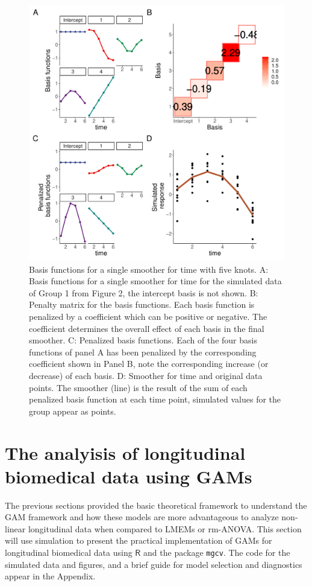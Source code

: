 \documentclass[
]{article}
\newcommand{\passthrough}[1]{#1}
\begin{document}
\begin{figure}[H]

{\centering \includegraphics[width=0.75\linewidth,]{Full_document_files/figure-latex/basis-plot-1} 

}

\caption{Basis functions for a single smoother for time with five knots. A: Basis functions for a single smoother for time for the simulated data of Group 1 from Figure 2, the intercept basis is not shown. B: Penalty matrix for the basis functions. Each basis function is penalized by a coefficient which can be positive or negative. The coefficient determines the overall effect of each basis in the final smoother. C: Penalized basis functions. Each of the four basis functions of panel A has been penalized by the corresponding coefficient shown in Panel B, note the corresponding increase (or decrease) of each basis. D: Smoother for time and original data points. The smoother (line) is the result of the sum of each penalized basis function at each time point, simulated values for the group appear as points.}\label{fig:basis-plot}
\end{figure}

\FloatBarrier

\newpage

\hypertarget{longitudinal-GAMs}{%
\section{The analyisis of longitudinal biomedical data using GAMs}\label{longitudinal-GAMs}}

The previous sections provided the basic theoretical framework to understand the GAM framework and how these models are more advantageous to analyze non-linear longitudinal data when compared to LMEMs or rm-ANOVA. This section will use simulation to present the practical implementation of GAMs for longitudinal biomedical data using \(\textsf{R}\) and the package \passthrough{\lstinline!mgcv!}. The code for the simulated data and figures, and a brief guide for model selection and diagnostics appear in the Appendix.
\end{document}
